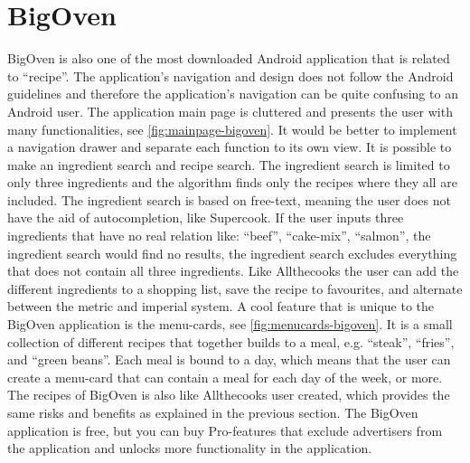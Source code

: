 \section{BigOven}
BigOven is also one of the most downloaded \cite{bigoven-googleplay} Android application that is related to ``recipe''. The application's navigation and design does not follow the Android guidelines\cite{guidelines-appstructure} and therefore the application's navigation can be quite confusing to an Android user.
The application main page is cluttered and presents the user with many functionalities, see \autoref{fig:mainpage-bigoven}. It would be better to implement a navigation drawer and separate each function to its own view.
It is possible to make an ingredient search and recipe search. The ingredient search is limited to only three ingredients and the algorithm finds only the recipes where they all are included. The ingredient search is based on free-text, meaning the user does not have the aid of autocompletion, like Supercook. If the user inputs three ingredients that have no real relation like: ``beef'', ``cake-mix'', ``salmon'', the ingredient search would find no results, the ingredient search excludes everything that does not contain all three ingredients.
Like Allthecooks the user can add the different ingredients to a shopping list, save the recipe to favourites, and alternate between the metric and imperial system.
A cool feature that is unique to the BigOven application is the menu-cards, see \autoref{fig:menucards-bigoven}.
It is a small collection of different recipes that together builds to a meal, e.g. ``steak'', ``fries'', and ``green beans''. Each meal is bound to a day, which means that the user can create a menu-card that can contain a meal for each day of the week, or more.
The recipes of BigOven is also like Allthecooks user created, which provides the same risks and benefits as explained in the previous section.
The BigOven application is free, but you can buy Pro-features that exclude advertisers from the application and unlocks more functionality in the application.

